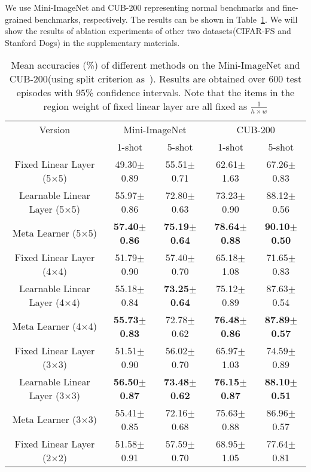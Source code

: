 \documentclass[letterpaper]{article}
\begin{document}
We use Mini-ImageNet and CUB-200 representing normal benchmarks and fine-grained benchmarks, respectively. The results can be shown in Table~\ref{table: ablation}. We will show the results of ablation experiments of other two datasets(CIFAR-FS and Stanford Dogs) in the supplementary materials. 

\begin{table}[h]\tiny
\begin{center}
\label{table: ablation}
\caption{Mean accuracies (\%) of different methods on the Mini-ImageNet and CUB-200(using split criterion as~\cite{li2019revisiting}). Results are obtained over 600 test episodes with 95\% confidence intervals. Note that the items in the region weight of fixed linear layer are all fixed as $\frac{1}{h\times w}$} \label{table: ablation}
\begin{tabular}{c c c c c}
  \hline
   Version&\multicolumn{2}{c}{Mini-ImageNet}&\multicolumn{2}{c}{CUB-200}\\
   &1-shot & 5-shot & 1-shot & 5-shot \\ \hline
  \hline
  Fixed Linear Layer (5$\times$5) & 49.30$\pm$0.89  & 55.51$\pm$0.71  & 62.61$\pm$1.63 & 67.26$\pm$0.83  \\
Learnable Linear Layer (5$\times$5) & 55.97$\pm$0.86  & 72.80$\pm$0.63  & 73.23$\pm$0.90 & 88.12$\pm$0.56  \\
  Meta Learner (5$\times$5) & \textbf{57.40$\pm$0.86} & \textbf{75.19$\pm$0.64} & \textbf{78.64$\pm$0.88} & \textbf{90.10$\pm$0.50}\\
  \hline
  Fixed Linear Layer (4$\times$4)& 51.79$\pm$0.90 & 57.40$\pm$0.70 & 65.18$\pm$1.08 & 71.65$\pm$0.83\\
  Learnable Linear Layer (4$\times$4) & 55.18$\pm$0.84 & \textbf{73.25$\pm$0.64} & 75.12$\pm$0.89 & 87.63$\pm$0.54  \\
  Meta Learner (4$\times$4)& \textbf{55.73$\pm$0.83} & 72.78$\pm$0.62 & \textbf{76.48$\pm$0.86} & \textbf{87.89$\pm$0.57} \\
  \hline
  Fixed Linear Layer (3$\times$3)& 51.51$\pm$0.90 & 56.02$\pm$0.70 & 65.97$\pm$1.03 & 74.59$\pm$0.89 \\
  Learnable Linear Layer (3$\times$3) & \textbf{56.50$\pm$0.87}  & \textbf{73.48$\pm$0.62}  & \textbf{76.15$\pm$0.87} & \textbf{88.10$\pm$0.51}  \\
  Meta Learner (3$\times$3)& 55.41$\pm$0.85 & 72.16$\pm$0.68 & 75.63$\pm$0.88 & 86.96$\pm$0.57 \\
\hline
  Fixed Linear Layer (2$\times$2)& 51.58$\pm$0.91 & 57.59$\pm$0.70 & 68.95$\pm$1.05 & 77.64$\pm$0.81 \\

\end{tabular}
\end{center}
\end{table}
\end{document}
